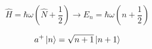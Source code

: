 \begin{multicols}{3}
  \begin{equation}
    \hat{H} = \hbar\omega\left(\hat{N} + \frac{1}{2}\right)
    \to
    E_n = \hbar\omega\left(n + \frac{1}{2}\right)
  \end{equation}

  \begin{equation}
    a^+\ket{n} = \sqrt{n+1}\ket{n+1}
  \end{equation}

\end{multicols}


